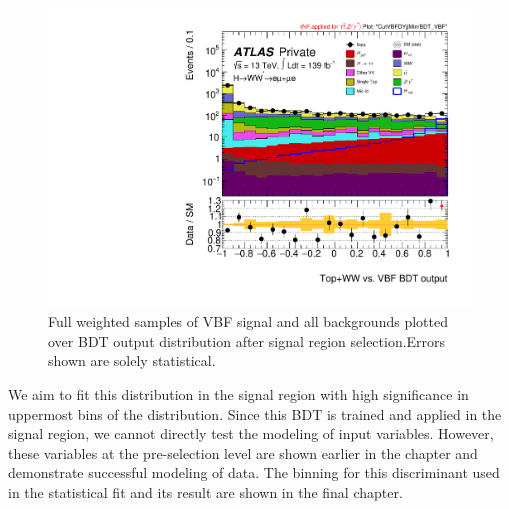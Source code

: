 \begin{figure}[!htbp]
\centering
  \includegraphics[width=.45\linewidth]{Pictures/run2-emme-CutVBFDYjjMin-BDT_VBF-log.pdf}
\caption{Full weighted samples of VBF signal and all backgrounds plotted over BDT output distribution after signal region selection.Errors shown are solely statistical.}
\label{fig:SRBDTresult2}
\end{figure}


We aim to fit this distribution in the signal region with high significance in uppermost bins of the distribution. Since this BDT is trained and applied in the signal region, we cannot directly test the modeling of input variables. However, these variables at the pre-selection level are shown earlier in the chapter and demonstrate successful modeling of data. The binning for this discriminant used in the statistical fit and its result are shown in the final chapter. 
